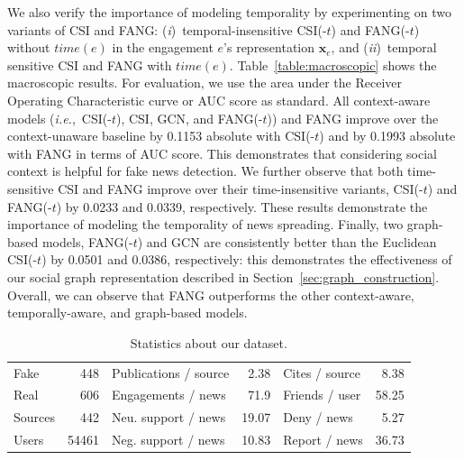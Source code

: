 \documentclass[sigconf]{acmart}
\theoremstyle{definition}
\theoremstyle{hypothesis}
\begin{document}
We also verify the importance of modeling temporality by experimenting on two variants of CSI and FANG: 
(\emph{i})~temporal-insensitive CSI(-$t$) and FANG(-$t$) 
without $time(e)$ in the engagement $e$'s representation $\boldsymbol{x}_{e}$, and (\emph{ii})~temporal sensitive CSI and FANG with $time(e)$. 
Table~\ref{table:macroscopic} shows the macroscopic results. 
For evaluation, we use the area under the Receiver Operating Characteristic curve or AUC score as standard. 
All context-aware models (\textit{i.e.},~CSI(-$t$), CSI, GCN, and FANG(-$t$)) and FANG improve over the context-unaware baseline by 0.1153 absolute
with CSI(-$t$) and by 0.1993 absolute with FANG in terms of AUC score. This demonstrates that considering social context is helpful for fake news detection. %
We further observe that both time-sensitive CSI and FANG improve over their time-insensitive variants, CSI(-$t$) and FANG(-$t$) by 0.0233 and 0.0339, respectively. These results demonstrate the importance of modeling the temporality of news spreading. Finally, two graph-based models, FANG(-$t$) and GCN are consistently better than the Euclidean CSI(-$t$) 
by 0.0501 and 0.0386, respectively: this demonstrates the effectiveness of our social graph representation described in Section~\ref{sec:graph_construction}. Overall, we can observe that FANG outperforms the other context-aware, temporally-aware, and graph-based models.
\begin{table}[tb]
    \centering
    \small
    \caption{Statistics about our dataset.}
    \begin{tabular}{l@{}rlrlr} 
    \toprule
        Fake & 448 & Publications / source & 2.38 &  Cites / source & 8.38 \\
        Real & 606 & Engagements / news & 71.9  &  Friends / user & 58.25 \\
        Sources & 442 & Neu. support / news & 19.07 & Deny / news & 5.27 \\
        Users & 54461 & Neg. support / news & 10.83 & Report / news & 36.73 \\ 
        \bottomrule
    \end{tabular}
    \label{table:dataset_statistics}
\end{table}
\end{document}
